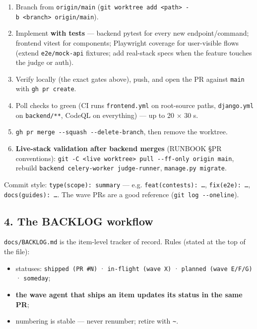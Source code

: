 \documentclass[
]{article}
\providecommand{\tightlist}{%
  \setlength{\itemsep}{0pt}\setlength{\parskip}{0pt}}
\begin{document}
\begin{enumerate}
\def\labelenumi{\arabic{enumi}.}
\tightlist
\item
  Branch from \texttt{origin/main}
  (\texttt{git\ worktree\ add\ \textless{}path\textgreater{}\ -b\ \textless{}branch\textgreater{}\ origin/main}).
\item
  Implement \textbf{with tests} --- backend pytest for every new
  endpoint/command; frontend vitest for components; Playwright coverage
  for user-visible flows (extend \texttt{e2e/mock-api} fixtures; add
  real-stack specs when the feature touches the judge or auth).
\item
  Verify locally (the exact gates above), push, and open the PR against
  \texttt{main} with \texttt{gh\ pr\ create}.
\item
  Poll checks to green (CI runs \texttt{frontend.yml} on root-source
  paths, \texttt{django.yml} on \texttt{backend/**}, CodeQL on
  everything) --- up to 20 × 30 s.
\item
  \texttt{gh\ pr\ merge\ -\/-squash\ -\/-delete-branch}, then remove the
  worktree.
\item
  \textbf{Live-stack validation after backend merges} (RUNBOOK §PR
  conventions):
  \texttt{git\ -C\ \textless{}live\ worktree\textgreater{}\ pull\ -\/-ff-only\ origin\ main},
  rebuild \texttt{backend\ celery-worker\ judge-runner},
  \texttt{manage.py\ migrate}.
\end{enumerate}

Commit style: \texttt{type(scope):\ summary} --- e.g.
\texttt{feat(contests):\ …}, \texttt{fix(e2e):\ …},
\texttt{docs(guides):\ …}. The wave PRs are a good reference
(\texttt{git\ log\ -\/-oneline}).

\subsection{4. The BACKLOG workflow}\label{4-the-backlog-workflow}

\texttt{docs/BACKLOG.md} is the item-level tracker of record. Rules
(stated at the top of the file):

\begin{itemize}
\tightlist
\item
  statuses: \texttt{shipped\ (PR\ \#N)} · \texttt{in-flight\ (wave\ X)}
  · \texttt{planned\ (wave\ E/F/G)} · \texttt{someday};
\item
  \textbf{the wave agent that ships an item updates its status in the
  same PR};
\item
  numbering is stable --- never renumber; retire with
  \texttt{\textasciitilde{}}.
\end{itemize}
\end{document}
